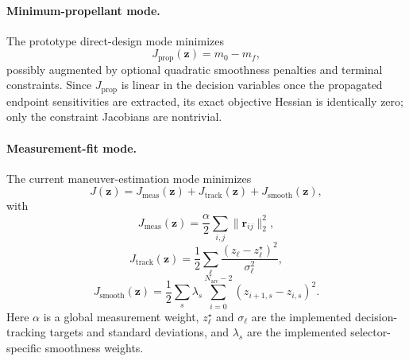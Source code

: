 \documentclass[11pt]{article}
\begin{document}
\paragraph{Minimum-propellant mode.}
The prototype direct-design mode minimizes
\begin{equation}
    J_{\mathrm{prop}}(\bm{z})
    =
    m_0 - m_f,
\end{equation}
possibly augmented by optional quadratic smoothness penalties and terminal
constraints. Since $J_{\mathrm{prop}}$ is linear in the decision variables once
the propagated endpoint sensitivities are extracted, its exact objective
Hessian is identically zero; only the constraint Jacobians are nontrivial.

\paragraph{Measurement-fit mode.}
The current maneuver-estimation mode minimizes
\begin{equation}
    J(\bm{z})
    =
    J_{\mathrm{meas}}(\bm{z})
    +
    J_{\mathrm{track}}(\bm{z})
    +
    J_{\mathrm{smooth}}(\bm{z}),
\end{equation}
with
\begin{equation}
    J_{\mathrm{meas}}(\bm{z})
    =
    \frac{\alpha}{2}
    \sum_{i,j}
    \|\bm{r}_{ij}\|_2^2,
\end{equation}
\begin{equation}
    J_{\mathrm{track}}(\bm{z})
    =
    \frac{1}{2}
    \sum_{\ell}
    \frac{(z_\ell-z_\ell^\star)^2}{\sigma_\ell^2},
\end{equation}
\begin{equation}
    J_{\mathrm{smooth}}(\bm{z})
    =
    \frac{1}{2}
    \sum_{s}
    \lambda_s
    \sum_{i=0}^{N_{\mathrm{arc}}-2}
    \left(
        z_{i+1,s}-z_{i,s}
    \right)^2.
\end{equation}
Here $\alpha$ is a global measurement weight,
$z_\ell^\star$ and $\sigma_\ell$ are the implemented decision-tracking targets
and standard deviations, and $\lambda_s$ are the implemented selector-specific
smoothness weights.
\end{document}
